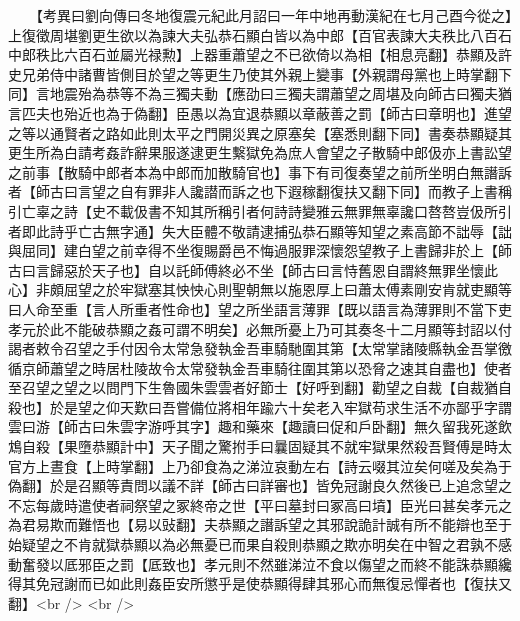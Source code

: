 　　【考異曰劉向傳曰冬地復震元紀此月詔曰一年中地再動漢紀在七月己酉今從之】　上復徵周堪劉更生欲以為諫大夫弘恭石顯白皆以為中郎【百官表諫大夫秩比八百石中郎秩比六百石並屬光禄勲】上器重蕭望之不已欲倚以為相【相息亮翻】恭顯及許史兄弟侍中諸曹皆側目於望之等更生乃使其外親上變事【外親謂母黨也上時掌翻下同】言地震殆為恭等不為三獨夫動【應劭曰三獨夫謂蕭望之周堪及向師古曰獨夫猶言匹夫也殆近也為于偽翻】臣愚以為宜退恭顯以章蔽善之罰【師古曰章明也】進望之等以通賢者之路如此則太平之門開災異之原塞矣【塞悉則翻下同】書奏恭顯疑其更生所為白請考姦詐辭果服遂逮更生繫獄免為庶人會望之子散騎中郎伋亦上書訟望之前事【散騎中郎者本為中郎而加散騎官也】事下有司復奏望之前所坐明白無譖訴者【師古曰言望之自有罪非人讒譛而訴之也下遐稼翻復扶又翻下同】而教子上書稱引亡辜之詩【史不載伋書不知其所稱引者何詩詩變雅云無罪無辜讒口嗸嗸豈伋所引者即此詩乎亡古無字通】失大臣體不敬請逮捕弘恭石顯等知望之素高節不詘辱【詘與屈同】建白望之前幸得不坐復賜爵邑不悔過服罪深懷怨望教子上書歸非於上【師古曰言歸惡於天子也】自以託師傅終必不坐【師古曰言恃舊恩自謂終無罪坐懷此心】非頗屈望之於牢獄塞其怏怏心則聖朝無以施恩厚上曰蕭太傅素剛安肯就吏顯等曰人命至重【言人所重者性命也】望之所坐語言薄罪【既以語言為薄罪則不當下吏孝元於此不能破恭顯之姦可謂不明矣】必無所憂上乃可其奏冬十二月顯等封詔以付謁者敕令召望之手付因令太常急發執金吾車騎馳圍其第【太常掌諸陵縣執金吾掌徼循京師蕭望之時居杜陵故令太常發執金吾車騎往圍其第以恐脅之速其自盡也】使者至召望之望之以問門下生魯國朱雲雲者好節士【好呼到翻】勸望之自裁【自裁猶自殺也】於是望之仰天歎曰吾嘗備位將相年踰六十矣老入牢獄苟求生活不亦鄙乎字謂雲曰游【師古曰朱雲字游呼其字】趣和藥來【趣讀曰促和戶卧翻】無久留我死遂飲鴆自殺【果墮恭顯計中】天子聞之驚拊手曰曩固疑其不就牢獄果然殺吾賢傅是時太官方上晝食【上時掌翻】上乃卻食為之涕泣哀動左右【詩云啜其泣矣何嗟及矣為于偽翻】於是召顯等責問以議不詳【師古曰詳審也】皆免冠謝良久然後已上追念望之不忘每歲時遣使者祠祭望之冢終帝之世【平曰墓封曰冢高曰墳】臣光曰甚矣孝元之為君易欺而難悟也【易以䜴翻】夫恭顯之譖訴望之其邪說詭計誠有所不能辯也至于始疑望之不肯就獄恭顯以為必無憂已而果自殺則恭顯之欺亦明矣在中智之君孰不感動奮發以厎邪臣之罰【厎致也】孝元則不然雖涕泣不食以傷望之而終不能誅恭顯纔得其免冠謝而已如此則姦臣安所懲乎是使恭顯得肆其邪心而無復忌憚者也【復扶又翻】<br />
<br />
